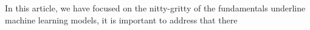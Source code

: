 In this article, we have focused on the nitty-gritty of the fundamentals underline machine learning models, it is important to address that there